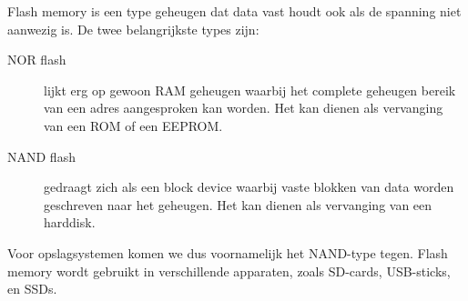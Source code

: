 Flash memory is een type geheugen dat data vast houdt ook als de spanning niet aanwezig is. De twee belangrijkste types zijn:
\begin{description}
	\item [NOR flash]  lijkt erg op gewoon RAM geheugen waarbij het complete geheugen bereik van een adres aangesproken kan worden. Het kan dienen als vervanging van een ROM of een EEPROM.
	\item [NAND flash]  gedraagt zich als een block device waarbij vaste blokken van data worden geschreven naar het geheugen. Het kan dienen als vervanging van een harddisk.
\end{description}
Voor opslagsystemen komen we dus voornamelijk het NAND-type tegen. Flash memory wordt gebruikt in verschillende apparaten, zoals SD-cards, USB-sticks, en SSDs.

